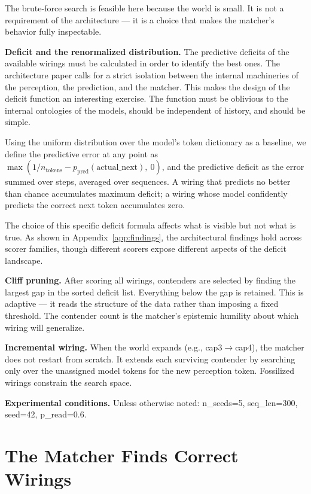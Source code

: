 \documentclass[12pt, a4paper]{article}
\begin{document}
The brute-force search is feasible here because the world is small. It is not a
requirement of the architecture --- it is a choice that makes the matcher's
behavior fully inspectable.

\textbf{Deficit and the renormalized distribution.} The predictive deficits of
the available wirings must be calculated in order to identify the best ones.
The architecture paper calls for a strict isolation between the internal
machineries of the perception, the prediction, and the matcher. This makes the
design of the deficit function an interesting exercise. The function must be
oblivious to the internal ontologies of the models, should be independent of
history, and should be simple.

Using the uniform distribution over the model's token dictionary as a baseline,
we define the predictive error at any point as $\max(1/n_{\mathrm{tokens}} -
p_{\mathrm{pred}}(\mathrm{actual\_next}),\ 0)$, and the predictive deficit as
the error summed over steps, averaged over sequences. A wiring that predicts no
better than chance accumulates maximum deficit; a wiring whose model
confidently predicts the correct next token accumulates zero.

The choice of this specific deficit formula affects what is visible but not
what is true. As shown in Appendix~\ref{app:findings}, the architectural
findings hold across scorer families, though different scorers expose different
aspects of the deficit landscape.

\textbf{Cliff pruning.} After scoring all wirings, contenders are selected by
finding the largest gap in the sorted deficit list. Everything below the gap is
retained. This is adaptive --- it reads the structure of the data rather than
imposing a fixed threshold. The contender count is the matcher's epistemic
humility about which wiring will generalize.

\textbf{Incremental wiring.} When the world expands (e.g., cap3$\to$cap4),
the matcher does not restart from scratch. It extends each surviving contender
by searching only over the unassigned model tokens for the new perception
token. Fossilized wirings constrain the search space.

\textbf{Experimental conditions.} Unless otherwise noted: n\_seeds=5,
seq\_len=300, seed=42, p\_read=0.6.

\section{The Matcher Finds Correct Wirings}
\label{sec:matcher}
\end{document}

